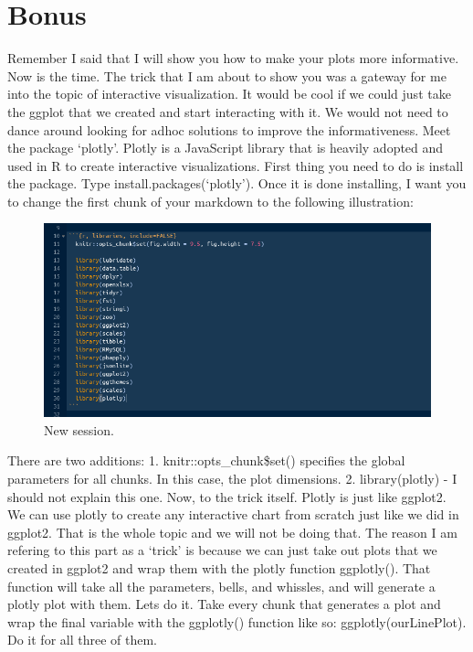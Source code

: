 \documentclass[]{book}
\begin{document}
\hypertarget{bonus-1}{%
\section{Bonus}\label{bonus-1}}

Remember I said that I will show you how to make your plots more informative. Now is the time. The trick that I am about to show you was a gateway for me into the topic of interactive visualization. It would be cool if we could just take the ggplot that we created and start interacting with it. We would not need to dance around looking for adhoc solutions to improve the informativeness. Meet the package `plotly'. Plotly is a JavaScript library that is heavily adopted and used in R to create interactive visualizations. First thing you need to do is install the package. Type install.packages(`plotly'). Once it is done installing, I want you to change the first chunk of your markdown to the following illustration:

\begin{figure}
\centering
\includegraphics{markdown13.png}
\caption{New session.}
\end{figure}

There are two additions: 1. knitr::opts\_chunk\$set() specifies the global parameters for all chunks. In this case, the plot dimensions. 2. library(plotly) - I should not explain this one. Now, to the trick itself. Plotly is just like ggplot2. We can use plotly to create any interactive chart from scratch just like we did in ggplot2. That is the whole topic and we will not be doing that. The reason I am refering to this part as a `trick' is because we can just take out plots that we created in ggplot2 and wrap them with the plotly function ggplotly(). That function will take all the parameters, bells, and whissles, and will generate a plotly plot with them. Lets do it. Take every chunk that generates a plot and wrap the final variable with the ggplotly() function like so: ggplotly(ourLinePlot). Do it for all three of them.
\end{document}
